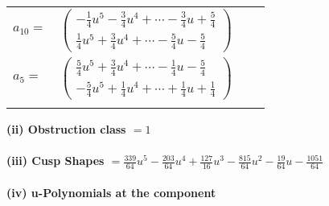 \documentclass[1p]{elsarticle_modified}
\theoremstyle{definition}
\begin{document}
\begin{tabular}{m{7pt} m{180pt} m{7pt} m{180pt} }
\flushright $a_{10}=$&$\begin{pmatrix}-\frac{1}{4} u^5-\frac{3}{4} u^4+\cdots-\frac{3}{4} u+\frac{5}{4}\\\frac{1}{4} u^5+\frac{3}{4} u^4+\cdots-\frac{5}{4} u-\frac{5}{4}\end{pmatrix}$ \\
\flushright $a_{5}=$&$\begin{pmatrix}\frac{5}{4} u^5+\frac{3}{4} u^4+\cdots-\frac{1}{4} u-\frac{5}{4}\\-\frac{5}{4} u^5+\frac{1}{4} u^4+\cdots+\frac{1}{4} u+\frac{1}{4}\end{pmatrix}$\\&\end{tabular}
\flushleft \textbf{(ii) Obstruction class $= 1$}\\~\\
\flushleft \textbf{(iii) Cusp Shapes $= \frac{339}{64} u^5-\frac{203}{64} u^4+\frac{127}{16} u^3-\frac{815}{64} u^2-\frac{19}{64} u-\frac{1051}{64}$}\\~\\
\newpage\renewcommand{\arraystretch}{1}
\flushleft \textbf{(iv) u-Polynomials at the component}\newline \\
\end{document}
